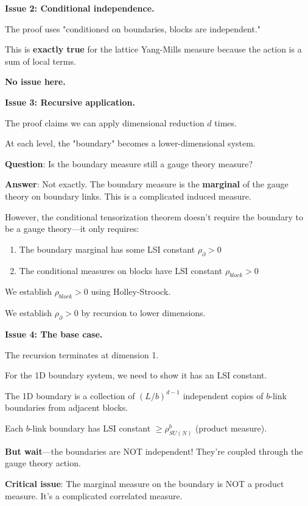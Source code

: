 \textbf{Issue 2: Conditional independence.}

The proof uses "conditioned on boundaries, blocks are independent."

This is \textbf{exactly true} for the lattice Yang-Mills measure because 
the action is a sum of local terms.

\textbf{No issue here.}

\textbf{Issue 3: Recursive application.}

The proof claims we can apply dimensional reduction $d$ times.

At each level, the "boundary" becomes a lower-dimensional system.

\textbf{Question}: Is the boundary measure still a gauge theory measure?

\textbf{Answer}: Not exactly. The boundary measure is the \textbf{marginal} 
of the gauge theory on boundary links. This is a complicated induced measure.

However, the conditional tensorization theorem doesn't require the boundary 
to be a gauge theory—it only requires:
\begin{enumerate}
\item The boundary marginal has some LSI constant $\rho_\partial > 0$
\item The conditional measures on blocks have LSI constant $\rho_{block} > 0$
\end{enumerate}

We establish $\rho_{block} > 0$ using Holley-Stroock.

We establish $\rho_\partial > 0$ by recursion to lower dimensions.

\textbf{Issue 4: The base case.}

The recursion terminates at dimension 1.

For the 1D boundary system, we need to show it has an LSI constant.

The 1D boundary is a collection of $(L/b)^{d-1}$ independent copies of 
$b$-link boundaries from adjacent blocks.

Each $b$-link boundary has LSI constant $\geq \rho_{SU(N)}^b$ (product measure).

\textbf{But wait}—the boundaries are NOT independent! They're coupled through 
the gauge theory action.

\textbf{Critical issue}: The marginal measure on the boundary is NOT a product 
measure. It's a complicated correlated measure.

